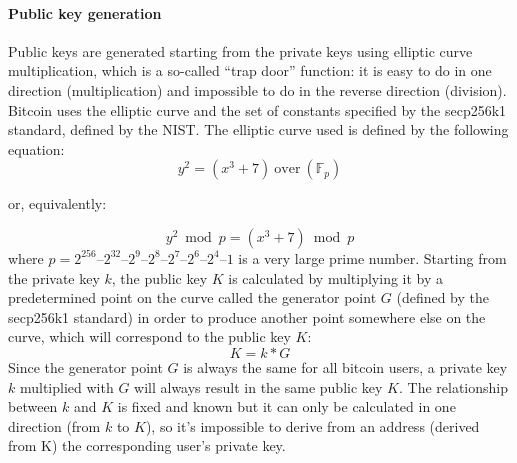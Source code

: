 \paragraph{Public key generation}
Public keys are generated starting from the private keys using elliptic curve
multiplication, which is a so-called ``trap door'' function: it is easy to do in
one direction (multiplication) and impossible to do in the reverse direction (division).
Bitcoin uses the elliptic curve and the set of constants specified by the secp256k1
standard, defined by the NIST. The elliptic curve used is defined by the following
equation:
\begin{equation}\label{eq:bitcoin-curve}
  y^2 = (x^3 + 7)~\text{over}~(\mathbb{F}_p)
\end{equation}
\begin{center}
  or, equivalently:
\end{center}
\begin{equation}
  y^2 \bmod p = (x^3 + 7) \bmod p
\end{equation}
where $p = 2^{256} – 2^{32} – 2^9 – 2^8 – 2^7 – 2^6 – 2^4 – 1$ is a very large prime number.
Starting from the private key $k$, the public key $K$ is calculated by multiplying
it by a predetermined point on the curve called the generator point $G$ (defined
by the secp256k1 standard) in order to produce another point somewhere else on
the curve, which will correspond to the public key $K$:
\[K = k * G\]
Since the generator point $G$ is always the same for all bitcoin users, a
private key $k$ multiplied with $G$ will always result in the same public key $K$.
The relationship between $k$ and $K$ is fixed and known but it can only be
calculated in one direction (from $k$ to $K$), so it's impossible to derive from
an address (derived from K) the corresponding user's private key.

